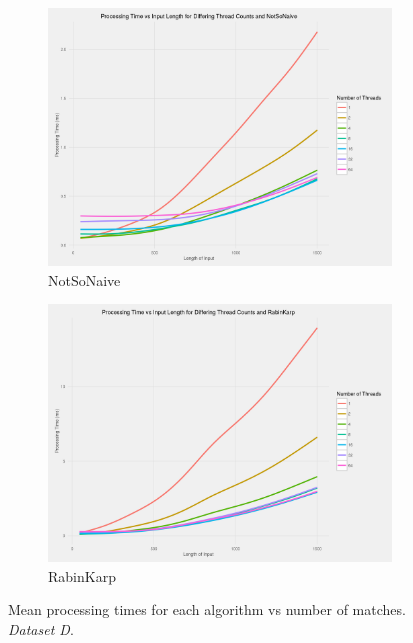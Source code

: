 \documentclass[11pt]{article}
\begin{document}
\begin{figure}[!htb]
\begin{subfigure}[b]{0.48\textwidth}
      \includegraphics[width=\textwidth]{images/scatter_elapsed_vs_input_length_many_cores_NotSoNaive}
      \caption{NotSoNaive}
  \end{subfigure}
  \begin{subfigure}[b]{0.48\textwidth}
      \includegraphics[width=\textwidth]{images/scatter_elapsed_vs_input_length_many_cores_Rabinkarp}
      \caption{RabinKarp}
  \end{subfigure}
  \caption{Mean processing times for each algorithm vs number of matches. \textit{Dataset D}.}
  \label{figure-processingtimevsinputlengthdifferentcores}
\end{figure}
\end{document}
